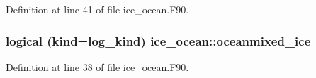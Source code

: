 Definition at line 41 of file ice\_\-ocean.F90.\hypertarget{namespaceice__ocean_ac7a4a91716b2a7a7aa7429576cb4375b}{
\subsubsection[{oceanmixed\_\-ice}]{\setlength{\rightskip}{0pt plus 5cm}logical (kind=log\_\-kind) {\bf ice\_\-ocean::oceanmixed\_\-ice}}}
\label{namespaceice__ocean_ac7a4a91716b2a7a7aa7429576cb4375b}


Definition at line 38 of file ice\_\-ocean.F90.